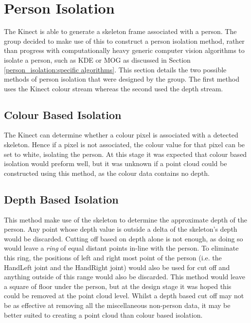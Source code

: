 \section{Person Isolation}
\label{design:person isolation}
The Kinect is able to generate a skeleton frame associated with a person.
The group decided to make use of this to construct a person isolation method, rather than progress with computationally heavy generic computer vision algorithms to isolate a person, such as KDE or MOG as discussed in Section \ref{person_isolation:specific algorithms}.
This section details the two possible methods of person isolation that were designed by the group. 
The first method uses the Kinect colour stream whereas the second used the depth stream.\\

\subsection{Colour Based Isolation}
\label{design:colour based isolation}
The Kinect can determine whether a colour pixel is associated with a detected skeleton. 
Hence if a pixel is not associated, the colour value for that pixel can be set to white, isolating the person. 
At this stage it was expected that colour based isolation would preform well, but it was unknown if a point cloud could be constructed using this method, as the colour data contains no depth.\\ 

\subsection{Depth Based Isolation}
\label{design:depth based isolation}
This method make use of the skeleton to determine the approximate depth of the person.
Any point whose depth value is outside a delta of the skeleton's depth would be discarded. 
Cutting off based on depth alone is not enough, as doing so would leave a \textit{ring} of equal distant points in-line with the person. 
To eliminate this ring, the positions of left and right most point of the person (i.e. the HandLeft joint and the HandRight joint) would also be used for cut off and anything outside of this range would also be discarded.
This method would leave a square of floor under the person, but at the design stage it was hoped this could be removed at the point cloud level. Whilst a depth based cut off may not be as effective at removing all the miscellaneous non-person data, it may be better suited to creating a point cloud than colour based isolation. \\ 